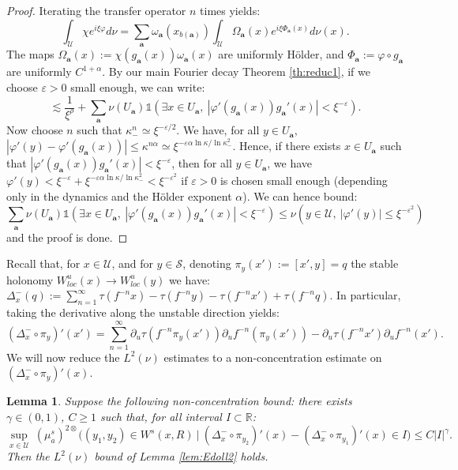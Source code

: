 \documentclass[a4paper]{article}
\newtheorem{lemma}[theorem]{Lemma}
\theoremstyle{definition}
\begin{document}
\begin{proof}
Iterating the transfer operator $n$ times yields:
$$\int_\mathcal{U} \chi e^{i \xi \varphi} d\nu = \sum_{\mathbf{a}} \omega_\mathbf{a}(x_{b(\mathbf{a})}) \int_{\mathcal{U}} \Omega_\mathbf{a}(x) e^{i \xi \Phi_\mathbf{a}(x)} d\nu(x). $$
The maps $\Omega_\mathbf{a}(x) := \chi(g_\mathbf{a}(x)) \omega_\mathbf{a}(x)$ are uniformly Hölder, and $\Phi_\mathbf{a} := \varphi \circ g_\mathbf{a}$ are uniformly $C^{1+\alpha}$. By our main Fourier decay Theorem \ref{th:reduc1}, if we choose $\varepsilon>0$ small enough, we can write:
$$ \lesssim \frac{1}{\xi^\rho} + \sum_\mathbf{a} \nu(U_\mathbf{a}) \mathbb{1}( \exists x \in U_\mathbf{a}, \ |\varphi'(g_\mathbf{a}(x)) g_\mathbf{a}'(x)| < \xi^{-\varepsilon} ). $$
Now choose $n$ such that $\kappa_-^{n} \simeq \xi^{-\varepsilon/2}$. 
We have, for all $y \in U_\mathbf{a}$, $|\varphi'(y)-\varphi'(g_\mathbf{a}(x))| \leq \kappa^{n \alpha} \simeq \xi^{-\varepsilon \alpha \ln\kappa/ \ln \kappa_-^2}$. Hence, if there exists $x \in U_\mathbf{a}$ such that $|\varphi'(g_\mathbf{a}(x)) g_\mathbf{a}'(x)| < \xi^{-\varepsilon}$, then for all $y \in U_\mathbf{a}$, we have $\varphi'(y) < \xi^{-\varepsilon} + \xi^{-\varepsilon \alpha \ln \kappa/\ln \kappa_-^2} < \xi^{-\varepsilon^2}$ if $\varepsilon>0$ is chosen small enough (depending only in the dynamics and the Hölder exponent $\alpha$). We can hence bound:
$$ \sum_\mathbf{a} \nu(U_\mathbf{a}) \mathbb{1}( \exists x \in U_\mathbf{a}, \ |\varphi'(g_\mathbf{a}(x)) g_\mathbf{a}'(x)| < \xi^{-\varepsilon} ) \leq \nu( y \in \mathcal{U}, \ |\varphi'(y)| \leq \xi^{-\varepsilon^2} ) $$
and the proof is done.
\end{proof}

Recall that, for $x \in \mathcal{U}$, and for $y \in \mathcal{S}$, denoting $\pi_y(x') := [x',y]=q$ the stable holonomy $W^u_{loc}(x) \rightarrow W^u_{loc}(y)$ we have: $\Delta_x^{-}(q) := \sum_{n=1}^\infty \tau(f^{-n} x) -  \tau(f^{-n} y) - \tau(f^{-n} x') + \tau(f^{-n} q)$. In particular, taking the derivative along the unstable direction yields:
$$  (\Delta^-_x \circ \pi_y)'(x') = \sum_{n=1}^\infty \partial_u \tau(f^{-n} \pi_{y}(x')) \partial_u f^{-n}(\pi_y(x')) - \partial_u \tau(f^{-n} x') \partial_u f^{-n}(x')  .$$
We will now reduce the $L^2(\nu)$ estimates to a non-concentration estimate on $ ( \Delta^-_x \circ \pi_y )'(x)$.

\begin{lemma}
Suppose the following non-concentration bound: there exists $\gamma\in(0,1)$, $C \geq 1$ such that, for all interval $I \subset \mathbb{R}$:
$$ \sup_{x \in \mathcal{U}} \ (\mu^s_a)^{2\otimes}\Big( (y_1,y_2) \in W^s(x,R) \ \Big| \  (\Delta^-_x \circ \pi_{y_2})'(x) - (\Delta^-_x \circ \pi_{y_1})'(x) \in I \Big) \leq C |I|^\gamma .$$
Then the $L^2(\nu)$ bound of Lemma \ref{lem:Edoll2} holds.
\end{lemma}
\end{document}
